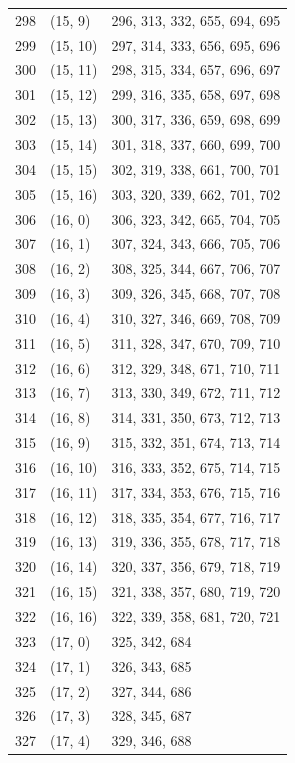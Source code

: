 \documentclass{article}
\begin{document}
\begin{longtable}{lll}
  298 & (15, 9) & 296, 313, 332, 655, 694, 695 \\
  299 & (15, 10) & 297, 314, 333, 656, 695, 696 \\
  300 & (15, 11) & 298, 315, 334, 657, 696, 697 \\
  301 & (15, 12) & 299, 316, 335, 658, 697, 698 \\
  302 & (15, 13) & 300, 317, 336, 659, 698, 699 \\
  303 & (15, 14) & 301, 318, 337, 660, 699, 700 \\
  304 & (15, 15) & 302, 319, 338, 661, 700, 701 \\
  305 & (15, 16) & 303, 320, 339, 662, 701, 702 \\
  306 & (16, 0) & 306, 323, 342, 665, 704, 705 \\
  307 & (16, 1) & 307, 324, 343, 666, 705, 706 \\
  308 & (16, 2) & 308, 325, 344, 667, 706, 707 \\
  309 & (16, 3) & 309, 326, 345, 668, 707, 708 \\
  310 & (16, 4) & 310, 327, 346, 669, 708, 709 \\
  311 & (16, 5) & 311, 328, 347, 670, 709, 710 \\
  312 & (16, 6) & 312, 329, 348, 671, 710, 711 \\
  313 & (16, 7) & 313, 330, 349, 672, 711, 712 \\
  314 & (16, 8) & 314, 331, 350, 673, 712, 713 \\
  315 & (16, 9) & 315, 332, 351, 674, 713, 714 \\
  316 & (16, 10) & 316, 333, 352, 675, 714, 715 \\
  317 & (16, 11) & 317, 334, 353, 676, 715, 716 \\
  318 & (16, 12) & 318, 335, 354, 677, 716, 717 \\
  319 & (16, 13) & 319, 336, 355, 678, 717, 718 \\
  320 & (16, 14) & 320, 337, 356, 679, 718, 719 \\
  321 & (16, 15) & 321, 338, 357, 680, 719, 720 \\
  322 & (16, 16) & 322, 339, 358, 681, 720, 721 \\
  323 & (17, 0) & 325, 342, 684 \\
  324 & (17, 1) & 326, 343, 685 \\
  325 & (17, 2) & 327, 344, 686 \\
  326 & (17, 3) & 328, 345, 687 \\
  327 & (17, 4) & 329, 346, 688 \\

\end{longtable}
\end{document}
